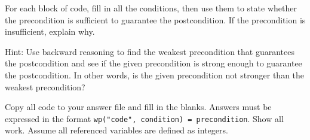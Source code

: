 \documentclass[11pt]{article}
\begin{document}
\newpage

\newline
For each block of code, fill in all the conditions, then use them to state whether the precondition is sufficient to guarantee the postcondition. If the precondition is insufficient, explain why.
\newline

\noindent Hint: Use backward reasoning to find the weakest precondition that guarantees the postcondition and see if the given precondition is strong enough to guarantee the postcondition. In other words, is the given precondition not stronger than the weakest precondition?
\newline

\noindent Copy all code to your answer file and fill in the blanks. Answers must be expressed in the format \verb*|wp("code", condition) = precondition|. Show all work. Assume all referenced variables are defined as integers.
\end{document}
